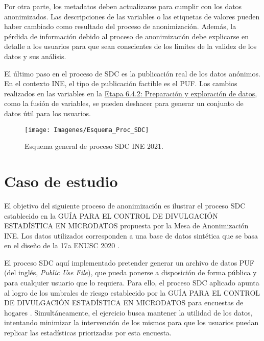 \documentclass[
]{book}
\theoremstyle{definition}
\theoremstyle{definition}
\theoremstyle{definition}
\theoremstyle{definition}
\theoremstyle{remark}
\begin{document}
Por otra parte, los metadatos deben actualizarse para cumplir con los datos anonimizados. Las descripciones de las variables o las etiquetas de valores pueden haber cambiado como resultado del proceso de anonimización. Además, la pérdida de información debido al proceso de anonimización debe explicarse en detalle a los usuarios para que sean conscientes de los límites de la validez de los datos y sus análisis.

El último paso en el proceso de SDC es la publicación real de los datos anónimos. En el contexto INE, el tipo de publicación factible es el PUF. Los cambios realizados en las variables en la \protect\hyperlink{etapa-6.4.2-preparaciuxf3n-y-exploraciuxf3n-de-datos}{Etapa 6.4.2: Preparación y exploración de datos}, como la fusión de variables, se pueden deshacer para generar un conjunto de datos útil para los usuarios.

\begin{figure}

{\centering \texttt{[image: Imagenes/Esquema\_Proc\_SDC]} 

}

\caption{Esquema general de proceso SDC INE 2021.}\label{fig:esquemaSDC}
\end{figure}

\hypertarget{caso-de-estudio}{%
\chapter{Caso de estudio}\label{caso-de-estudio}}

El objetivo del siguiente proceso de anonimización es ilustrar el proceso SDC establecido en la GUÍA PARA EL CONTROL DE DIVULGACIÓN ESTADÍSTICA EN MICRODATOS propuesta por la Mesa de Anonimización INE. Los datos utilizados corresponden a una base de datos sintética que se basa en el diseño de la 17a ENUSC 2020 \citep{manualbdenusc}.

El proceso SDC aquí implementado pretender generar un archivo de datos PUF (del inglés, \emph{Public Use File}), que pueda ponerse a disposición de forma pública y para cualquier usuario que lo requiera. Para ello, el proceso SDC aplicado apunta al logro de los umbrales de riesgo establecido por la GUÍA PARA EL CONTROL DE DIVULGACIÓN ESTADÍSTICA EN MICRODATOS para encuestas de hogares \citep{manualsdcine}. Simultáneamente, el ejercicio busca mantener la utilidad de los datos, intentando minimizar la intervención de los mismos para que los usuarios puedan replicar las estadísticas priorizadas por esta encuesta.
\end{document}
